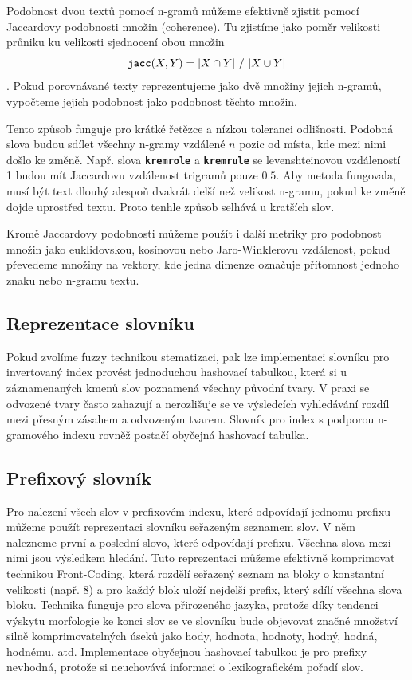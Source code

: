 \documentclass[11pt,letterpaper,oneside,openright]{book}
\newcommand{\bftt}[1]{\texttt{\textbf{#1}}}
\begin{document}
Podobnost dvou textů pomocí n-gramů můžeme efektivně zjistit pomocí Jaccardovy
podobnosti množin (coherence). Tu zjistíme jako poměr velikosti průniku ku
velikosti sjednocení obou množin \[\bftt{jacc}(X, Y) = |X \cap Y|\ /\ |X \cup
Y|\]. Pokud porovnávané texty reprezentujeme jako dvě množiny jejich n-gramů,
vypočteme jejich podobnost jako podobnost těchto množin.

Tento způsob funguje pro krátké řetězce a nízkou toleranci odlišnosti. Podobná
slova budou sdílet všechny n-gramy vzdálené $n$ pozic od místa, kde mezi nimi
došlo ke změně. Např. slova \bftt{kremrole} a \bftt{kremrule} se
levenshteinovou vzdáleností 1 budou mít Jaccardovu vzdálenost trigramů pouze
$0.5$. Aby metoda fungovala, musí být text dlouhý alespoň dvakrát delší než
velikost n-gramu, pokud ke změně dojde uprostřed textu. Proto tenhle způsob
selhává u kratších slov.

Kromě Jaccardovy podobnosti můžeme použít i další metriky pro podobnost množin
jako euklidovskou, kosínovou nebo Jaro-Winklerovu vzdálenost, pokud převedeme
množiny na vektory, kde jedna dimenze označuje přítomnost jednoho znaku nebo
n-gramu textu.


\subsection{Reprezentace slovníku}
Pokud zvolíme fuzzy technikou stematizaci, pak lze implementaci slovníku pro
invertovaný index provést jednoduchou hashovací tabulkou, která si u
záznamenaných kmenů slov poznamená všechny původní tvary. V praxi se odvozené
tvary často zahazují a nerozlišuje se ve výsledcích vyhledávání rozdíl mezi
přesným zásahem a odvozeným tvarem. Slovník pro index s podporou n-gramového
indexu rovněž postačí obyčejná hashovací tabulka.

\subsection{Prefixový slovník}
Pro nalezení všech slov v prefixovém indexu, které odpovídají jednomu prefixu
můžeme použít reprezentaci slovníku seřazeným seznamem slov. V něm nalezneme
první a poslední slovo, které odpovídají prefixu. Všechna slova mezi nimi jsou
výsledkem hledání.  Tuto reprezentaci můžeme efektivně komprimovat technikou
Front-Coding, která rozdělí seřazený seznam na bloky o konstantní velikosti
(např. 8) a pro každý blok uloží nejdelší prefix, který sdílí všechna slova
bloku. Technika funguje pro slova přirozeného jazyka, protože díky tendenci
výskytu morfologie ke konci slov se ve slovníku bude objevovat značné množství
silně komprimovatelných úseků jako hody, hodnota, hodnoty, hodný, hodná,
hodnému, atd. Implementace obyčejnou hashovací tabulkou je pro prefixy
nevhodná, protože si neuchovává informaci o lexikografickém pořadí slov.
\end{document}
